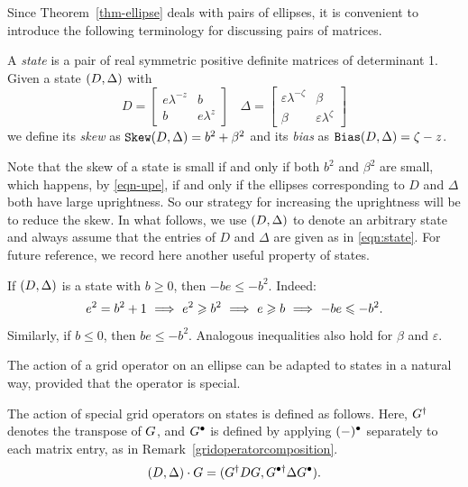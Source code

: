Since Theorem~\ref{thm-ellipse} deals with pairs of ellipses, it is
convenient to introduce the following terminology for discussing pairs
of matrices.

\begin{definition}
A \emph{state} is a pair of real symmetric positive 
definite matrices of determinant 1. Given a state 
$(D,\Delta)$ with
\begin{equation}
\label{eqn:state}
  D =
  \left[ 
    \begin{array}{cc} 
      e{\lambda^{-z}} & b \\
      b & e{\lambda^{z}}
    \end{array} 
  \right]
  ~~~~
  \Delta =
  \left[ 
    \begin{array}{cc} 
      \varepsilon{\lambda^{-\zeta}} & \beta \\
      \beta & \varepsilon{\lambda^{\zeta}}
    \end{array} 
  \right]
\end{equation}
we define its \emph{skew} as 
$\mathtt{Skew}(D,\Delta)=b^2+\beta^2$ and its
\emph{bias} as $\mathtt{Bias} (D,\Delta) 
=\zeta-z$.
\end{definition}

Note that the skew of a state is small if and only if both $b^2$ and
$\beta^2$ are small, which happens, by {\eqref{eqn-upe}}, if and only
if the ellipses corresponding to $D$ and $\Delta$ both have large
uprightness. So our strategy for increasing the uprightness will be to
reduce the skew. In what follows, we use $(D,\Delta)$ to denote an
arbitrary state and always assume that the entries of $D$ and $\Delta$
are given as in \eqref{eqn:state}. For future reference, we record
here another useful property of states.

\begin{remark}\label{rem-be}
If $(D,\Delta)$ is a state with $b\geq 0$,
then $-be\leq -b^2$. Indeed:
\[
e^2=b^2+1 ~\Longrightarrow~ e^2\geqslant b^2 ~\Longrightarrow~ e\geqslant b ~\Longrightarrow~ -be\leqslant -b^2.
\]
Similarly, if $b\leq 0$, then $be\leq -b^2$. Analogous 
inequalities also hold for $\beta$ and $\varepsilon$.
\end{remark}

The action of a grid operator on an ellipse can be adapted to states
in a natural way, provided that the operator is special.

\begin{definition}
\label{definition_action}
The action of special grid operators on states is defined as
follows. Here, $G^{\dagger}$ denotes the transpose of $G$, and $G^{\bullet}$ is
defined by applying $(-)^{\bullet}$ separately to each matrix entry, as in
Remark~\ref{gridoperatorcomposition}.
\[
(D,\Delta)\cdot G = (G^\dagger DG,G^{\bullet\dagger} \Delta G^\bullet).
\]
\end{definition}

